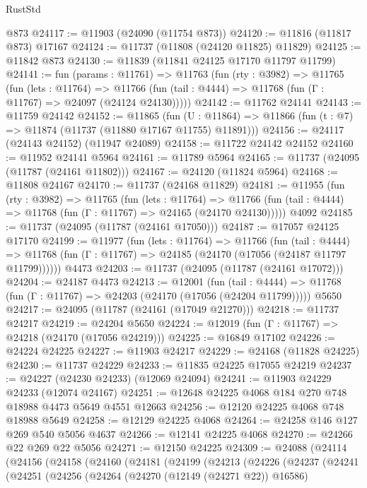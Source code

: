 \begin{lexlean}{RustStd}
\begin{coremodule}
    @873
@24117 := @11903 (@24090 (@11754 @873))
@24120 := @11816 (@11817 @873) @17167
@24124 := @11737 (@11808 (@24120 @11825) @11829)
@24125 := @11842 @873
@24130 := @11839 (@11841 @24125 @17170 @11797 @11799)
@24141 := fun (params : @11761) =>
  @11763
    (fun (rty : @3982) =>
    @11765
      (fun (lets : @11764) =>
      @11766 (fun (tail : @4444) => @11768 (fun (Γ : @11767) => @24097 (@24124 @24130)))))
@24142 := @11762 @24141
@24143 := @11759 @24142
@24152 := @11865
    (fun (U : @11864) => @11866 (fun (t : @7) => @11874 (@11737 (@11880 @17167 @11755) @11891)))
@24156 := @24117 (@24143 @24152) (@11947 @24089)
@24158 := @11722 @24142 @24152
@24160 := @11952 @24141 @5964
@24161 := @11789 @5964
@24165 := @11737 (@24095 (@11787 (@24161 @11802)))
@24167 := @24120 (@11824 @5964)
@24168 := @11808 @24167
@24170 := @11737 (@24168 @11829)
@24181 := @11955
    (fun (rty : @3982) =>
    @11765
      (fun (lets : @11764) =>
      @11766 (fun (tail : @4444) => @11768 (fun (Γ : @11767) => @24165 (@24170 @24130)))))
    @4092
@24185 := @11737 (@24095 (@11787 (@24161 @17050)))
@24187 := @17057 @24125 @17170
@24199 := @11977
    (fun (lets : @11764) =>
    @11766
      (fun (tail : @4444) =>
      @11768 (fun (Γ : @11767) => @24185 (@24170 (@17056 (@24187 @11797 @11799))))))
    @4473
@24203 := @11737 (@24095 (@11787 (@24161 @17072)))
@24204 := @24187 @4473
@24213 := @12001
    (fun (tail : @4444) => @11768 (fun (Γ : @11767) => @24203 (@24170 (@17056 (@24204 @11799)))))
    @5650
@24217 := @24095 (@11787 (@24161 (@17049 @21270)))
@24218 := @11737 @24217
@24219 := @24204 @5650
@24224 := @12019 (fun (Γ : @11767) => @24218 (@24170 (@17056 @24219)))
@24225 := @16849 @17102
@24226 := @24224 @24225
@24227 := @11903 @24217
@24229 := @24168 (@11828 @24225)
@24230 := @11737 @24229
@24233 := @11835 @24225 @17055 @24219
@24237 := @24227 (@24230 @24233) (@12069 @24094)
@24241 := @11903 @24229 @24233 (@12074 @24167)
@24251 := @12648 @24225 @4068 @184 @270 @748 @18988 @4473 @5649 @4551 @12663
@24256 := @12120 @24225 @4068 @748 @18988 @5649
@24258 := @12129 @24225 @4068
@24264 := @24258 @146 @127 @269 @540 @5056 @4637
@24266 := @12141 @24225 @4068
@24270 := @24266 @22 @269 @22 @5056
@24271 := @12150 @24225
@24309 := @24088
    (@24114
      (@24156
        (@24158
          (@24160
            (@24181
              (@24199
                (@24213
                  (@24226
                    (@24237
                      (@24241
                        (@24251
                          (@24256
                            (@24264
                              (@24270 (@12149 (@24271 @22)) @16586)

\end{coremodule}
\end{lexlean}
